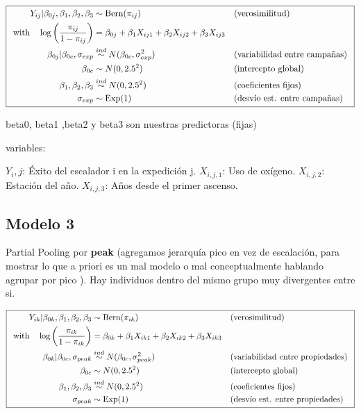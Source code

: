 \documentclass[
  letterpaper,
  DIV=11,
  numbers=noendperiod]{scrartcl}
\begin{document}
\[
\boxed{
\hspace{0.5em}
\begin{aligned}
Y_{ij} | \beta_{0j}, \beta_1, \beta_2, \beta_3 & \sim \text{Bern}(\pi_{ij}) && \text{(verosimilitud)} \\
\text{with} \quad \log\left(\frac{\pi_{ij}}{1-\pi_{ij}}\right) & = \beta_{0j} + \beta_1 X_{ij1} + \beta_2 X_{ij2} + \beta_3 X_{ij3}\\
\beta_{0j} | \beta_{0c}, \sigma_{exp} & \overset{ind}{\sim} N(\beta_{0c}, \sigma_{exp}^2) && \text{(variabilidad entre campañas)} \\
\beta_{0c} & \sim N(0, 2.5^2) && \text{(intercepto global)} \\
\beta_1, \beta_2, \beta_3 & \overset{ind}{\sim} N(0, 2.5^2) && \text{(coeficientes fijos)} \\
\sigma_{exp} & \sim \text{Exp}(1) && \text{(desvío est. entre campañas)}
\end{aligned}
\hspace{0.5em}
}
\]

beta0, beta1 ,beta2 y beta3 son nuestras predictoras (fijas)

variables:

\(Y_i,j\): Éxito del escalador i en la expedición j. \(X_{i,j,1}\): Uso
de oxígeno. \(X_{i,j,2}\): Estación del año. \(X_{i,j,3}\): Años desde
el primer ascenso.

\subsection{Modelo 3}\label{modelo-3}

Partial Pooling por \textbf{peak} (agregamos jerarquía pico en vez de
escalación, para mostrar lo que a priori es un mal modelo o mal
conceptualmente hablando agrupar por pico ). Hay individuos dentro del
mismo grupo muy divergentes entre si.

\[\boxed{
\hspace{0.5em}
\begin{aligned}
Y_{ik} | \beta_{0k}, \beta_1, \beta_2, \beta_3 & \sim \text{Bern}(\pi_{ik}) && \text{(verosimilitud)} \\
\text{with} \quad \log\left(\frac{\pi_{ik}}{1-\pi_{ik}}\right) & = \beta_{0k} + \beta_1 X_{ik1} + \beta_2 X_{ik2} + \beta_3 X_{ik3} \\
\beta_{0k} | \beta_{0c}, \sigma_{peak} & \overset{ind}{\sim} N(\beta_{0c}, \sigma_{peak}^2) && \text{(variabilidad entre propiedades)} \\
\beta_{0c} & \sim N(0, 2.5^2) && \text{(intercepto global)} \\
\beta_1, \beta_2, \beta_3 & \overset{ind}{\sim} N(0, 2.5^2) && \text{(coeficientes fijos)} \\
\sigma_{peak} & \sim \text{Exp}(1) && \text{(desvío est. entre propiedades)}
\end{aligned}
\hspace{0.5em}
}\]
\end{document}
